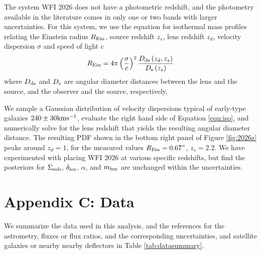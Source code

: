 The system WFI 2026 does not have a photometric redshift, and the photometry available in the literature comes in only one or two bands with larger uncertainties. For this system, we use the equation for isothermal mass profiles relating the Einstein radius $R_{\rm{Ein}} $, source redshift $z_s$, lens redshift $z_d$, velocity dispersion $\sigma$ and speed of light $c$
\begin{equation}
\label{eqn:iso}
R_{\rm{Ein}} = 4 \pi \left(\frac{\sigma}{c}\right)^2 \frac{D_{\rm{ds}}\left(z_d, z_s\right)}{D_{\rm{s}}\left(z_s\right)}
\end{equation}
where $D_{\rm{ds}}$ and $D_{\rm{s}}$ are angular diameter distances between the lens and the source, and the observer and the source, respectively. 

We sample a Gaussian distribution of velocity dispersions typical of early-type galaxies $240 \pm 30 \rm{km} \rm{s^{-1}}$, evaluate the right hand side of Equation \ref{eqn:iso}, and numerically solve for the lens redshift that yields the resulting angular diameter distance. The resulting PDF shown in the bottom right panel of Figure \ref{fig:2026z} peaks around $z_d=1$, for the measured values $R_{\rm{Ein}}  = 0.67"$, $z_s = 2.2$. We have experimented with placing WFI 2026 at various specific redshifts, but find the posteriors for $\Sigma_{\rm{sub}}$, $\delta_{\rm{los}}$, $\alpha$, and ${m_{\rm{hm}}}$ are unchanged within the uncertainties.

\section{\bf Appendix C: Data}
\label{app:C}
We summarize the data used in this analysis, and the references for the astrometry, fluxes or flux ratios, and the corresponding uncertainties, and satellite galaxies or nearby nearby deflectors in Table \ref{tab:datasummary}. 

